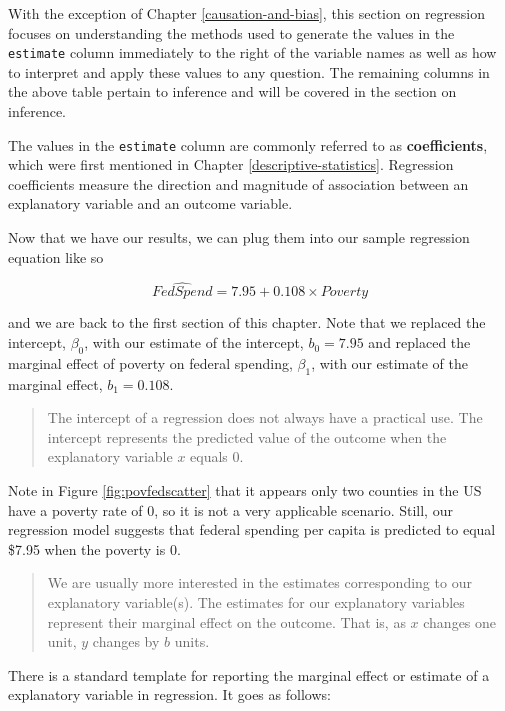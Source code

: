 \documentclass[
]{book}
\begin{document}
With the exception of Chapter \ref{causation-and-bias}, this section on regression focuses on understanding the methods used to generate the values in the \texttt{estimate} column immediately to the right of the variable names as well as how to interpret and apply these values to any question. The remaining columns in the above table pertain to inference and will be covered in the section on inference.

The values in the \texttt{estimate} column are commonly referred to as \textbf{coefficients}, which were first mentioned in Chapter \ref{descriptive-statistics}. Regression coefficients measure the direction and magnitude of association between an explanatory variable and an outcome variable.

Now that we have our results, we can plug them into our sample regression equation like so

\begin{equation}
\hat{FedSpend}=7.95+0.108 \times Poverty
\label{eq:simregresults}
\end{equation}

and we are back to the first section of this chapter. Note that we replaced the intercept, \(\beta_0\), with our estimate of the intercept, \(b_0=7.95\) and replaced the marginal effect of poverty on federal spending, \(\beta_1\), with our estimate of the marginal effect, \(b_1=0.108\).

\begin{quote}
The intercept of a regression does not always have a practical use. The intercept represents the predicted value of the outcome when the explanatory variable \(x\) equals 0.
\end{quote}

Note in Figure \ref{fig:povfedscatter} that it appears only two counties in the US have a poverty rate of 0, so it is not a very applicable scenario. Still, our regression model suggests that federal spending per capita is predicted to equal \$7.95 when the poverty is 0.

\begin{quote}
We are usually more interested in the estimates corresponding to our explanatory variable(s). The estimates for our explanatory variables represent their marginal effect on the outcome. That is, as \(x\) changes one unit, \(y\) changes by \(b\) units.
\end{quote}

There is a standard template for reporting the marginal effect or estimate of a explanatory variable in regression. It goes as follows:
\end{document}
